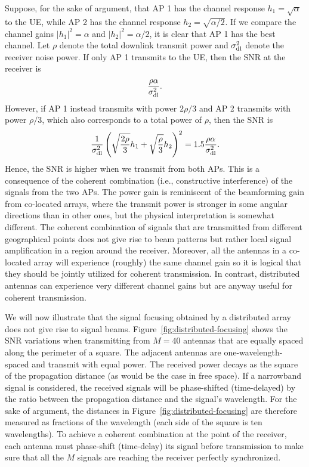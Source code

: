 \enlargethispage{\baselineskip} 
Suppose, for the sake of argument, that AP 1 has the channel response $h_1=\sqrt{\alpha}$ to the \gls{UE}, while AP 2 has the channel response $h_2=\sqrt{\alpha/2}$. If we compare the channel gains $|h_1|^2=\alpha$ and $|h_2|^2=\alpha/2$, it is clear that AP 1 has the best channel.
Let $\rho$ denote the total downlink transmit power and $\sigma^2_{\mathrm{dl}}$ denote the receiver noise power. If only \gls{AP} 1 transmits to the \gls{UE}, then the \gls{SNR} at the receiver is
\begin{equation}
\frac{\rho \alpha}{\sigma^2_{\mathrm{dl}}}.
\end{equation}
However, if \gls{AP} 1 instead transmits with power $2\rho/3$ and \gls{AP} 2 transmits with power $\rho/3$, which also corresponds to a total power of $\rho$, then the \gls{SNR} is
\begin{equation}\label{eq:downlink-SNR}
\frac{1}{\sigma^2_{\mathrm{dl}}} \left( \sqrt{\frac{2\rho}{3}} h_1 + \sqrt{\frac{\rho}{3}} h_2 \right)^2 =1.5 \frac{\rho \alpha}{\sigma^2_{\mathrm{dl}}}.
\end{equation}
Hence, the \gls{SNR} is higher when we transmit from both \glspl{AP}. This is a consequence of the coherent combination (i.e., constructive interference) of the signals from the two \glspl{AP}. The power gain is reminiscent of the beamforming gain from co-located arrays, where the transmit power is stronger in some angular directions than in other ones, but the physical interpretation is somewhat different. 
The coherent combination of signals that are transmitted from different geographical points does not give rise to beam patterns but rather local signal amplification in a region around the receiver.
Moreover, all the antennas in a co-located array will experience (roughly) the same channel gain so it is logical that they should be jointly utilized for coherent transmission. In contrast, distributed antennas can experience very different channel gains but are anyway useful for coherent transmission.

We will now illustrate that the signal focusing obtained by a distributed array does not give rise to signal beams.
Figure~\ref{fig:distributed-focusing} shows the \gls{SNR} variations when transmitting from $M=40$ antennas that are equally spaced along the perimeter of a square. The adjacent antennas are one-wavelength-spaced and transmit with equal power. The received power decays as the square of the propagation distance (as would be the case in free space). If a narrowband signal is considered, the received signals will be phase-shifted (time-delayed) by the ratio between the propagation distance and the signal's wavelength. For the sake of argument, the distances in Figure~\ref{fig:distributed-focusing} are therefore measured as fractions of the wavelength (each side of the square is ten wavelengths). To achieve a coherent combination at the point of the receiver, each antenna must phase-shift (time-delay) its signal before transmission to make sure that all the $M$ signals are reaching the receiver perfectly synchronized.

